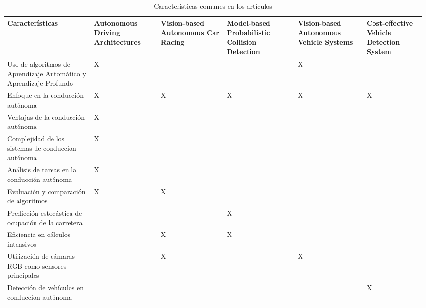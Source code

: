 \documentclass[10pt,letterpaper,final]{article}
\begin{document}
    \begin{table}
        \centering
        \caption{Características comunes en los artículos}
        \begin{tabular}{|p{4cm}|p{2cm}|p{2cm}|p{2cm}|p{2cm}|p{2cm}|}
            \hline
            \textbf{Características}
            & \textbf{Autonomous Driving Architectures \cite{bachute2021autonomous}}
            & \textbf{Vision-based Autonomous Car Racing \cite{cai2021vision}}
            & \textbf{Model-based Probabilistic Collision Detection \cite{althoff2009model}}
            & \textbf{Vision-based Autonomous Vehicle Systems \cite{pavel2022vision}}
            & \textbf{Cost-effective Vehicle Detection System \cite{alam2022cost}} \\
            \hline
            Uso de algoritmos de Aprendizaje Automático y Aprendizaje Profundo & X &   &   & X &   \\
            \hline
            Enfoque en la conducción autónoma                                  & X & X & X & X & X \\
            \hline
            Ventajas de la conducción autónoma                                 & X &   &   &   &   \\
            \hline
            Complejidad de los sistemas de conducción autónoma                 & X &   &   &   &   \\
            \hline
            Análisis de tareas en la conducción autónoma                       & X &   &   &   &   \\
            \hline
            Evaluación y comparación de algoritmos                             & X & X &   &   &   \\
            \hline
            Predicción estocástica de ocupación de la carretera                &   &   & X &   &   \\
            \hline
            Eficiencia en cálculos intensivos                                  &   & X & X &   &   \\
            \hline
            Utilización de cámaras RGB como sensores principales               &   & X &   & X &   \\
            \hline
            Detección de vehículos en conducción autónoma                      &   &   &   &   & X \\
            \hline
        \end{tabular}
    \end{table}
    
    
\end{document}

